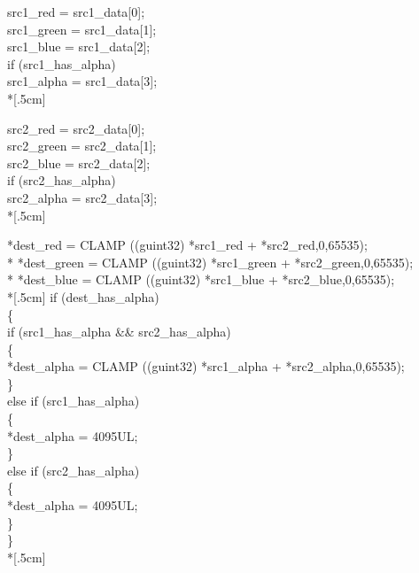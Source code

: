 \documentclass{foils}
\begin{document}
{\begin{flushleft}
src1\_red = src1\_data[0];\\
src1\_green = src1\_data[1];\\
src1\_blue = src1\_data[2];\\
if (src1\_has\_alpha)\\
\hspace*{.4cm} src1\_alpha = src1\_data[3];\\*[.5cm]

src2\_red = src2\_data[0];\\
src2\_green = src2\_data[1];\\
src2\_blue = src2\_data[2];\\
if (src2\_has\_alpha)\\
\hspace*{.4cm} src2\_alpha = src2\_data[3];\\*[.5cm]

*dest\_red = CLAMP ((guint32)   *src1\_red + *src2\_red,0,65535);\\*
*dest\_green = CLAMP ((guint32)   *src1\_green + *src2\_green,0,65535);\\*
*dest\_blue = CLAMP ((guint32)   *src1\_blue + *src2\_blue,0,65535);\\*[.5cm] 
if (dest\_has\_alpha)\\
\hspace*{.4cm} \{\\
\hspace*{.8cm} if (src1\_has\_alpha \&\& src2\_has\_alpha)\\
\hspace*{1.2cm} \{\\
\hspace*{1.6cm} *dest\_alpha = CLAMP ((guint32)   *src1\_alpha + *src2\_alpha,0,65535);\\
\hspace*{1.2cm} \}\\
\hspace*{.8cm} else if (src1\_has\_alpha)\\
\hspace*{1.2cm} \{\\
\hspace*{1.6cm} *dest\_alpha = 4095UL;\\
\hspace*{1.2cm} \}\\
\hspace*{.8cm} else if (src2\_has\_alpha)\\
\hspace*{1.2cm} \{\\
\hspace*{1.6cm} *dest\_alpha = 4095UL;\\
\hspace*{1.2cm} \}\\
\hspace*{.4cm} \}\\*[.5cm]
         

\end{flushleft}}
\end{document}
